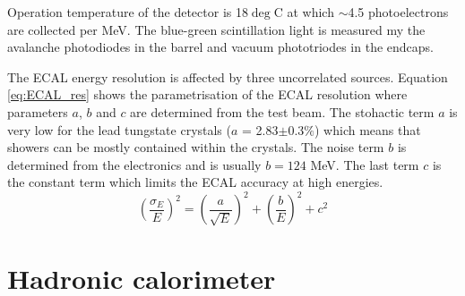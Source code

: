 \par Operation temperature of the detector is 18$\deg$C at which $\sim$4.5 photoelectrons are collected per MeV. The blue-green scintillation light is measured my the avalanche photodiodes in the barrel and vacuum phototriodes in the endcaps.   
\par The ECAL energy resolution is affected by three uncorrelated sources. Equation \ref{eq:ECAL_res} shows the parametrisation of the ECAL resolution where parameters $a$, $b$ and $c$ are determined from the test beam. The stohactic term $a$ is very low for the lead tungstate crystals ($a$ = 2.83$\pm$0.3$\%$) which means that showers can be mostly contained within the crystals. The noise term $b$ is determined from the electronics and is usually $b=124$ MeV. The last term $c$ is the constant term which limits the ECAL accuracy at high energies.   
\begin{equation}
\left(\frac{\sigma_E}{E}\right)^2 = \left(\frac{a}{\sqrt{E}}\right)^2 + \left(\frac{b}{E}\right)^2 + c^2
\label{eq:ECAL_res}
\end{equation}   


\section{Hadronic calorimeter}

